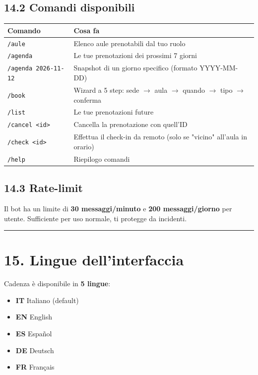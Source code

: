 \documentclass[11pt,a4paper]{article}
\begin{document}
\subsection{14.2 Comandi disponibili}


\begin{table}[H]
\centering
\small
\begin{tabularx}{\linewidth}{|X|X|}
\hline
\rowcolor{tableheader} Comando & Cosa fa \\
\hline
\texttt{/aule} & Elenco aule prenotabili dal tuo ruolo \\
\hline
\texttt{/agenda} & Le tue prenotazioni dei prossimi 7 giorni \\
\hline
\texttt{/agenda 2026-11-12} & Snapshot di un giorno specifico (formato YYYY-MM-DD) \\
\hline
\texttt{/book} & Wizard a 5 step: sede $\rightarrow$ aula $\rightarrow$ quando $\rightarrow$ tipo $\rightarrow$ conferma \\
\hline
\texttt{/list} & Le tue prenotazioni future \\
\hline
\texttt{/cancel \textless{}id\textgreater{}} & Cancella la prenotazione con quell'ID \\
\hline
\texttt{/check \textless{}id\textgreater{}} & Effettua il check-in da remoto (solo se "vicino" all'aula in orario) \\
\hline
\texttt{/help} & Riepilogo comandi \\
\hline
\end{tabularx}
\end{table}


\subsection{14.3 Rate-limit}


Il bot ha un limite di \textbf{30 messaggi/minuto} e \textbf{200 messaggi/giorno} per utente. Sufficiente per uso normale, ti protegge da incidenti.

\medskip\hrule\medskip

\section{15. Lingue dell'interfaccia}


Cadenza è disponibile in \textbf{5 lingue}:

\begin{itemize}
  \item \textbf{IT} Italiano (default)
  \item \textbf{EN} English
  \item \textbf{ES} Español
  \item \textbf{DE} Deutsch
  \item \textbf{FR} Français
\end{itemize}
\end{document}
